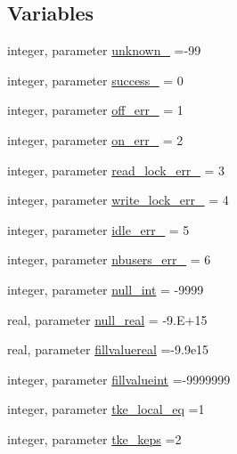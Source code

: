 \subsection*{Variables}
\begin{DoxyCompactItemize}
\item 
integer, parameter \mbox{\hyperlink{namespacemodulegotm_a0f598f7a7591ef502047d7bf9b41d8c4}{unknown\+\_\+}} =-\/99
\item 
integer, parameter \mbox{\hyperlink{namespacemodulegotm_adb6c42c1323d939b70b00c98f2106d11}{success\+\_\+}} = 0
\item 
integer, parameter \mbox{\hyperlink{namespacemodulegotm_af65e84e018f76a3a2d29f65589808c9d}{off\+\_\+err\+\_\+}} = 1
\item 
integer, parameter \mbox{\hyperlink{namespacemodulegotm_a97522a5857d2ea9ecdacaa45e530f142}{on\+\_\+err\+\_\+}} = 2
\item 
integer, parameter \mbox{\hyperlink{namespacemodulegotm_ac9524a6d32be82ce6528becff10d08ff}{read\+\_\+lock\+\_\+err\+\_\+}} = 3
\item 
integer, parameter \mbox{\hyperlink{namespacemodulegotm_ae9156b93cafbf0c50087599b64ff3d3d}{write\+\_\+lock\+\_\+err\+\_\+}} = 4
\item 
integer, parameter \mbox{\hyperlink{namespacemodulegotm_a39953f54bbdc8da782f3b50feef9d448}{idle\+\_\+err\+\_\+}} = 5
\item 
integer, parameter \mbox{\hyperlink{namespacemodulegotm_a98f0c25fc8853b787887f1ed35c706ad}{nbusers\+\_\+err\+\_\+}} = 6
\item 
integer, parameter \mbox{\hyperlink{namespacemodulegotm_a2e888b1f33eea5d6198b2b74c27aa11d}{null\+\_\+int}} = -\/9999
\item 
real, parameter \mbox{\hyperlink{namespacemodulegotm_a89fe021c998471f10e1252fbabba387c}{null\+\_\+real}} = -\/9.\+E+15
\item 
real, parameter \mbox{\hyperlink{namespacemodulegotm_a2faf16339e8c12fe4c7d39478460810f}{fillvaluereal}} =-\/9.\+9e15
\item 
integer, parameter \mbox{\hyperlink{namespacemodulegotm_a6843f6d6c95d7d5cbd9b92d5b399bd7c}{fillvalueint}} =-\/9999999
\item 
integer, parameter \mbox{\hyperlink{namespacemodulegotm_ac70f3cf4ffada602b184d8ccf56aea81}{tke\+\_\+local\+\_\+eq}} =1
\item 
integer, parameter \mbox{\hyperlink{namespacemodulegotm_af7d3b24a327afe4fa750141548a9e5f8}{tke\+\_\+keps}} =2
\item 

\end{DoxyCompactItemize}
